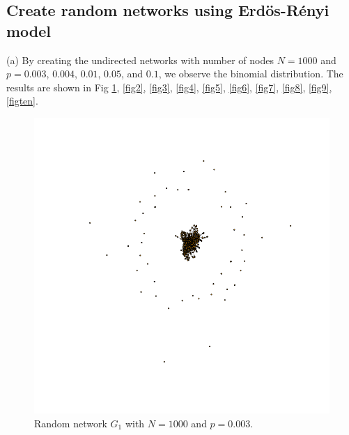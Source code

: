 \documentclass[draftcls,12pt,onecolumn]{IEEEtran}
\begin{document}
\subsection{Create random networks using Erd\"os-R\'enyi model}
(a) By creating the undirected networks with number of nodes $N=1000$ and $p=0.003$, $0.004$, $0.01$, $0.05$, and $0.1$, we observe the binomial distribution. The results are shown in Fig \ref{fig1}, \ref{fig2}, \ref{fig3}, \ref{fig4}, \ref{fig5}, \ref{fig6}, \ref{fig7}, \ref{fig8}, \ref{fig9}, \ref{figten}.
\begin{figure}[H]
\centering
\begin{minipage}[t]{0.48\textwidth}
\centering
\includegraphics[scale=0.2]{figures_part1_1/output_3_0.png}
\caption{Random network $G_1$ with $N=1000$ and $p=0.003$.}
\label{fig1}
\end{minipage}
\begin{minipage}[t]{0.48\textwidth}
\centering

\end{minipage}
\end{figure}
\end{document}

